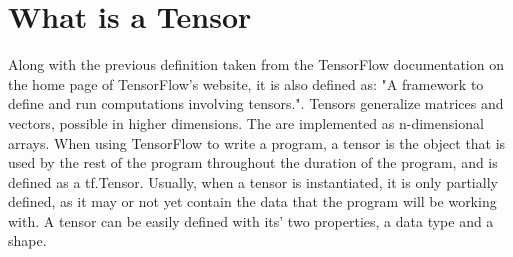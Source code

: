 \documentclass[12pt]{report} %
\begin{document}
\section{What is a Tensor}
	Along with the previous definition taken from the TensorFlow documentation on the home page of TensorFlow's website, it is also defined as: "A framework to define and run computations involving tensors."\cite{tensorFlow}. Tensors generalize matrices and vectors, possible in higher dimensions. The are implemented as n-dimensional arrays. When using TensorFlow to write a program, a tensor is the object that is used by the rest of the program throughout the duration of the program, and is defined as a tf.Tensor. Usually, when a tensor is instantiated, it is only partially defined, as it may or not yet contain the data that the program will be working with. A tensor can be easily defined with its' two properties, a data type and a shape\cite{tensorFlow}.
	
\end{document}
